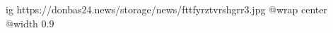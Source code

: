  
 
 
 
 

\ifcmt
  ig https://donbas24.news/storage/news/fttfyrztvrshgrr3.jpg
  @wrap center
  @width 0.9
\fi
